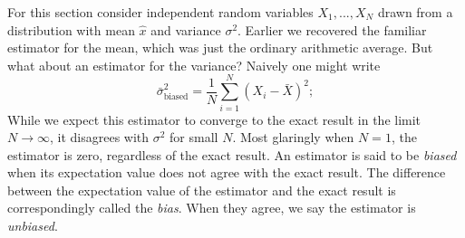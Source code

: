 For this section consider independent random variables $X_1,...,X_N$ 
drawn from a distribution with mean $\hat{x}$ and variance $\sigma^2$. 
Earlier we recovered the familiar estimator for the mean, which was
just the ordinary arithmetic average. But what about an estimator for 
the variance? Naively one might write
\begin{equation}\label{eq:bad}
  \bar{\sigma}^2_{\text{biased}}=\frac{1}{N}\sum_{i=1}^N(X_i-\bar{X})^2;
\end{equation} 
While we expect this estimator to converge to the
exact result in the limit $N\to\infty$, it disagrees with
$\sigma^2$ for small $N$. Most glaringly when $N=1$, the
estimator is zero, regardless of the exact result.
An estimator is said to be {\it biased} when its expectation value
does not agree with the exact result. The difference between the
expectation value of the estimator and the exact result is
correspondingly called the {\it bias}. When they agree, we say
the estimator is {\it unbiased}.
